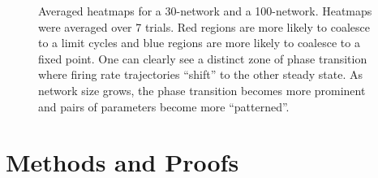\begin{figure}[h]
\begin{subfigure}{0.45\textwidth}
         \label{fig:1b}
     \end{subfigure}
     \caption{Averaged heatmaps for a 30-network and a 100-network. Heatmaps were averaged over 7 trials. Red regions are more likely to coalesce to a limit cycles and blue regions are more likely to coalesce to a fixed point. One can clearly see a distinct zone of phase transition where firing rate trajectories ``shift'' to the other steady state. As network size grows, the phase transition becomes more prominent and pairs of parameters become more ``patterned''.}
     \label{fig:1}
\end{figure}

\section{Methods and Proofs}
\label{sec:Methods and Proofs}


